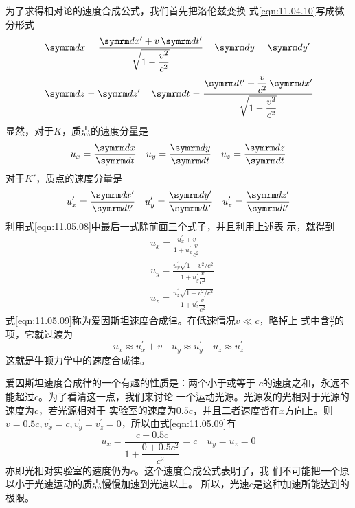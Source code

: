 \documentclass[../outline-of-mechanics.tex]{subfiles}
\begin{document}
为了求得相对论的速度合成公式，我们首先把洛伦兹变换
\lhbrak 式\eqref{eqn:11.04.10}\rhbrak 写成微分形式
\begin{equation}\label{eqn:11.05.08}
  \begin{aligned}
     & \dif x=\frac{ \dif x^{\prime}+v \dif t^{\prime}}{\sqrt{1-\dfrac{v^{2}}{c^{2}}}} \quad \dif y= \dif y^{\prime}                \\
     & \dif z= \dif z^{\prime} \quad \dif t=\frac{ \dif t^{\prime}+\dfrac{v}{c^{2}} \dif x^{\prime}}{\sqrt{1-\dfrac{v^{2}}{c^{2}}}}
  \end{aligned}
\end{equation}
显然，对于$ K $，质点的速度分量是
\begin{equation*}
  u _ { x } = \frac { \dif x } { \dif t }
  \quad
  u _ { y } = \frac { \dif y } { \dif t }
  \quad
  u _ { z } = \frac { \dif z } { \dif t }
\end{equation*}
对于$ K ' $，质点的速度分量是
\begin{equation*}
  u _ x ^ { \prime } = \frac { \dif x ^ { \prime } } { \dif t ^ { \prime } }
  \quad
  u _ y ^ { \prime } = \frac { \dif y ^ { \prime } } { \dif t ^ { \prime } }
  \quad
  u _ z ^ { \prime } = \frac { \dif z ^ { \prime } } { \dif t ^ { \prime } }
\end{equation*}
利用式\eqref{eqn:11.05.08}中最后一式除前面三个式子，并且利用上述表
示，就得到
\begin{equation}\label{eqn:11.05.09}
  \begin{aligned}
     & u_{x}=\frac{u_{x}^{\prime}+v}{1+u_{x}^{\prime} \dfrac{v}{c^{2}}}                      \\
     & u_{y}=\frac{u_{y}^{\prime} \sqrt{1-v^{2} / c^{2}}}{1+u_{y}^{\prime} \dfrac{v}{c^{2}}} \\
     & u_{z}=\frac{u_{z}^{\prime} \sqrt{1-v^{2} / c^{2}}}{1+u_{z}^{\prime} \dfrac{v}{c^{2}}}
  \end{aligned}
\end{equation}
式\eqref{eqn:11.05.09}称为爱因斯坦速度合成律。在低速情况$ v \ll c $，略掉上
式中含$ \frac { v } { c } $的项，它就过渡为
\begin{equation*}
  u _ { x } \approx u _ { x } ^ { \prime } + v
  \quad
  u _ { y } \approx u _ { y } ^ { \prime }
  \quad
  u _ { z } \approx u _ { z } ^ { \prime }
\end{equation*}
这就是牛顿力学中的速度合成律。

爱因斯坦速度合成律的一个有趣的性质是：两个小于或等于
$ c $的速度之和，永远不能超过$ c $。为了看清这一点，我们来讨论
一个运动光源。光源发的光相对于光源的速度为$ c $，若光源相对于
实验室的速度为$ 0.5c $，并且二者速度皆在$ x $方向上。则$ v = 0 . 5 c,
  v _ x ^ { \prime } = c, v _ { y } ^ { \prime } = v _ { z } ^ { \prime } = 0 $，所以由式\eqref{eqn:11.05.09}有
\begin{equation*}
  u _ { x } = \frac { c + 0 . 5 c } { 1 + \dfrac { 0 + 0 . 5 c ^ { 2 } } { c ^ { 2 } } } = c
  \quad
  u _ { y } = u _ { z } = 0
\end{equation*}
亦即光相对实验室的速度仍为$ c $。这个速度合成公式表明了，我
们不可能把一个原以小于光速运动的质点慢慢加速到光速以上。
所以，光速$ c $是这种加速所能达到的极限。
\end{document}
